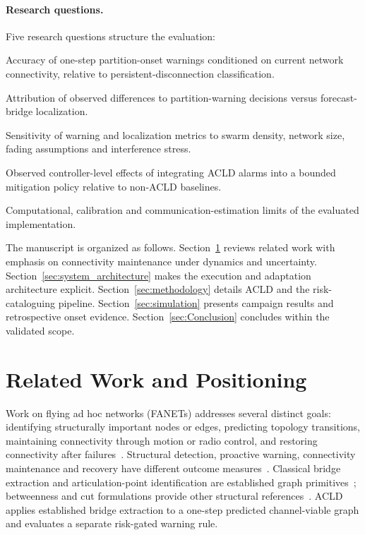 \documentclass[preprint,12pt]{elsarticle}
\theoremstyle{definition}\newtheorem{definition}{Definition}
\theoremstyle{plain}\newtheorem{theorem}{Theorem}
\theoremstyle{plain}\newtheorem{lemma}{Lemma}
\theoremstyle{plain}\newtheorem{corollary}{Corollary}
\theoremstyle{plain}\newtheorem{assumption}{Assumption}
\theoremstyle{remark}\newtheorem{remark}[theorem]{Remark}
\begin{document}
\paragraph{Research questions.}
Five research questions structure the evaluation:
\begin{description}[leftmargin=1.15cm,labelwidth=0.95cm,font=\normalfont\bfseries]
  \item[RQ1.] Accuracy of one-step partition-onset warnings conditioned on current network connectivity, relative to persistent-disconnection classification.
  \item[RQ2.] Attribution of observed differences to partition-warning decisions versus forecast-bridge localization.
  \item[RQ3.] Sensitivity of warning and localization metrics to swarm density, network size, fading assumptions and interference stress.
  \item[RQ4.] Observed controller-level effects of integrating ACLD alarms into a bounded mitigation policy relative to non-ACLD baselines.
  \item[RQ5.] Computational, calibration and communication-estimation limits of the evaluated implementation.
\end{description}

The manuscript is organized as follows. Section~\ref{sec:lit_comparative_summary}
reviews related work with emphasis on connectivity maintenance under dynamics and uncertainty.
Section~\ref{sec:system_architecture} makes the execution and adaptation architecture explicit.
Section~\ref{sec:methodology} details ACLD and the risk-cataloguing pipeline. Section~\ref{sec:simulation}
presents campaign results and retrospective onset evidence. Section~\ref{sec:Conclusion} concludes within the validated scope.

\section{Related Work and Positioning}\label{sec:lit_comparative_summary}

Work on flying ad hoc networks (FANETs) addresses several distinct goals: identifying structurally important nodes or edges, predicting topology transitions, maintaining connectivity through motion or radio control, and restoring connectivity after failures~\cite{yanmaz2022relay,yanmaz2023joint,luo2025isac}. Structural detection, proactive warning, connectivity maintenance and recovery have different outcome measures~\cite{guven2024multiobjective}. Classical bridge extraction and articulation-point identification are established graph primitives~\cite{tarjan1972dfs}; betweenness and cut formulations provide other structural references~\cite{brandes2001betweenness,stoer1997mincut,nagamochi1992edgeconn}. ACLD applies established bridge extraction to a one-step predicted channel-viable graph and evaluates a separate risk-gated warning rule.
\end{document}
